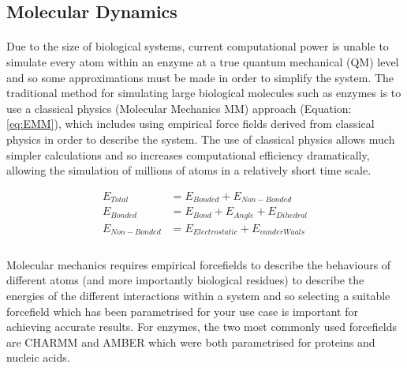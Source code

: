 \subsection{Molecular Dynamics}
\paragraph{}
Due to the size of biological systems, current computational power is unable to simulate every atom within an enzyme at a true quantum mechanical (QM) level and so some approximations must be made in order to simplify the system. The traditional method for simulating large biological molecules such as enzymes is to use a classical physics (Molecular Mechanics MM) approach (Equation: \ref{eq:EMM}), which includes using empirical force fields derived from classical physics in order to describe the system. The use of classical physics allows much simpler calculations and so increases computational efficiency dramatically, allowing the simulation of millions of atoms in a relatively short time scale. 

\begin{equation}
\label{eq:EMM}
\begin{split}
E_{Total} & = E_{Bonded} + E_{Non-Bonded} \\
E_{Bonded} & = E_{Bond} + E_{Angle} + E_{Dihedral} \\
E_{Non-Bonded} & = E_{Electrostatic} + E_{van der Waals} \\
\end{split}
\end{equation}

\paragraph{}
Molecular mechanics requires empirical forcefields\cite{Ponder2003ForceSimulations} to describe the behaviours of different atoms (and more importantly biological residues) to describe the energies of the different interactions within a system and so selecting a suitable forcefield which has been parametrised for your use case is important for achieving accurate results. For enzymes, the two most commonly used forcefields are CHARMM\cite{Vanommeslaeghe2009CHARMMFields} and AMBER\cite{Maier2015Ff14SB:Ff99SB} which were both parametrised for proteins and nucleic acids. 

